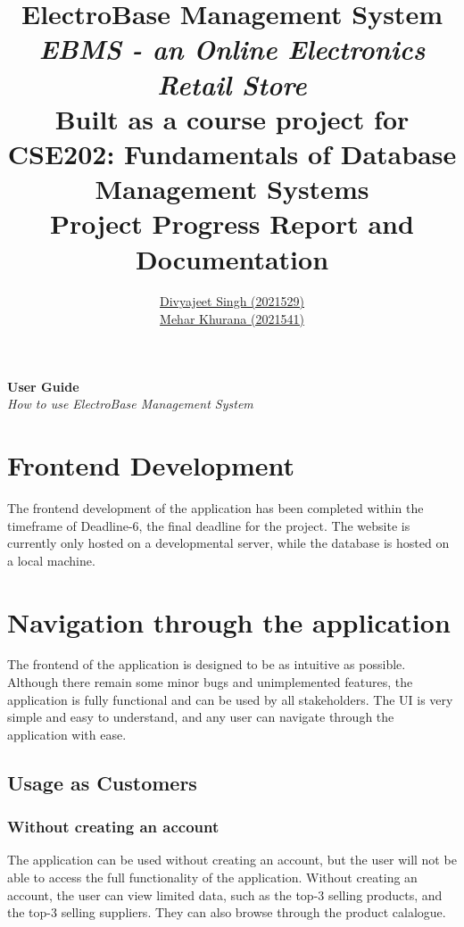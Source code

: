 \documentclass[12pt]{report}
\title{
    \textbf{\Huge ElectroBase Management System} \\
    \vspace*{10pt}
    \large{\textit{EBMS - an Online Electronics Retail Store}} \\
    \vspace*{20pt}
    Built as a course project for \\
    CSE202: Fundamentals of Database Management Systems \\
    \vspace*{25pt}
    \textbf{\Large Project Progress Report and Documentation}
    \vfill
}
\author{
    \href{mailto:divyajeet21529@iiitd.ac.in}{Divyajeet Singh (2021529)} \\
    \vspace*{20pt}
    \href{mailto:mehar21541@iiitd.ac.in}{Mehar Khurana (2021541)}
}
\date{
    \vfill
    \textbf{\today}
    \vspace*{15pt}
    \begin{center}
        \texttt{[image: Logo-1]}
    \end{center}
}
\begin{document}
    \maketitle

    
    
    
    
    
    

    \hspace{0pt}
    \vfill
    \begin{center}
        \Huge \textbf{User Guide} \\
        \vspace*{5pt}
        \Large \textit{How to use ElectroBase Management System}
    \end{center}
    \vfill
    \pagebreak

    \section*{\Huge Frontend Development}
    \vspace*{10pt}

    The frontend development of the application has been completed within the timeframe of Deadline-6, the final deadline for the project.
    The website is currently only hosted on a developmental server, while the database is hosted on a local machine.

    \section*{\Huge Navigation through the application}
    \vspace*{10pt}

    The frontend of the application is designed to be as intuitive as possible.
    Although there remain some minor bugs and unimplemented features, the application is fully functional and can be used by all stakeholders.
    The UI is very simple and easy to understand, and any user can navigate through the application with ease.

    \subsection*{Usage as Customers}
    \subsubsection*{Without creating an account}
    The application can be used without creating an account, but the user will not be able to access the full functionality of the application.
    Without creating an account, the user can view limited data, such as the top-3 selling products, and the top-3 selling suppliers.
    They can also browse through the product calalogue.
\end{document}
